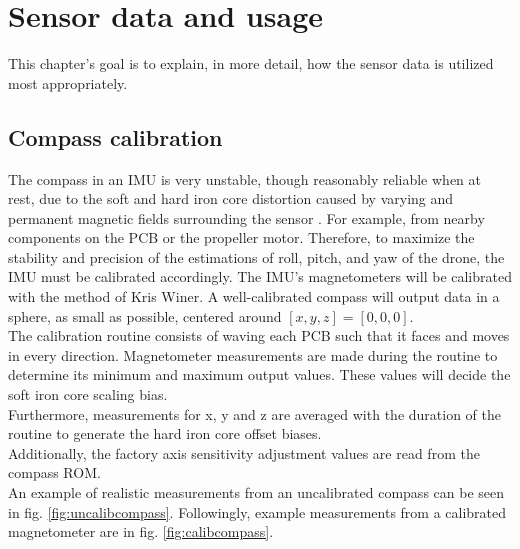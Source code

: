 \chapter{Sensor data and usage} \label{chap:sensordataandusage}%
This chapter's goal is to explain, in more detail, how the sensor data is utilized most appropriately. 

\section{Compass calibration}
The compass in an IMU is very unstable, though reasonably reliable when at rest, due to the soft and hard iron core distortion caused by varying and permanent magnetic fields surrounding the sensor \cite{magnetometercorrections}. For example, from nearby components on the PCB or the propeller motor.
Therefore, to maximize the stability and precision of the estimations of roll, pitch, and yaw of the drone, the IMU must be calibrated accordingly.
The IMU's magnetometers will be calibrated with the method of Kris Winer\cite{compasscalib}. A well-calibrated compass will output data in a sphere, as small as possible, centered around $[x,y,z]=[0,0,0]$.\\
The calibration routine consists of waving each PCB such that it faces and moves in every direction. Magnetometer measurements are made during the routine to determine its minimum and maximum output values. These values will decide the soft iron core scaling bias.\\
Furthermore, measurements for x, y and z are averaged with the duration of the routine to generate the hard iron core offset biases.\\
Additionally, the factory axis sensitivity adjustment values are read from the compass ROM. \\
An example of realistic measurements from an uncalibrated compass can be seen in fig. \ref{fig:uncalibcompass}. Followingly, example measurements from a calibrated magnetometer are in fig. \ref{fig:calibcompass}.

